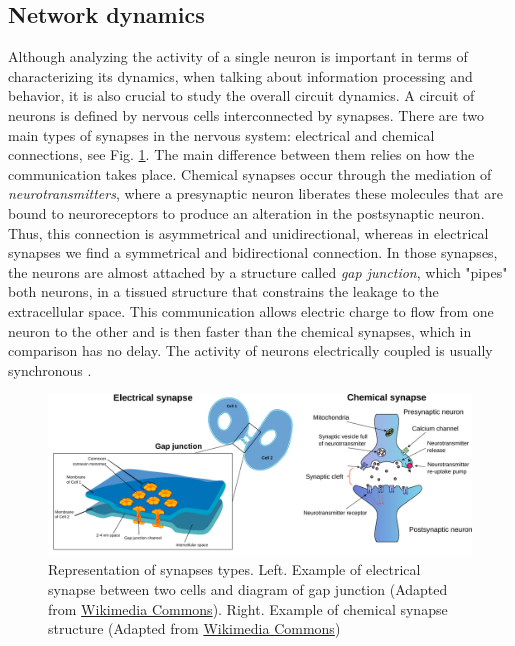 \subsection{Network dynamics}

Although analyzing the activity of a single neuron is important in terms of characterizing its dynamics, when talking about information processing and behavior, it is also crucial to study the overall circuit dynamics. A circuit of neurons is defined by nervous cells interconnected by synapses. There are two main types of synapses in the nervous system: electrical and chemical connections, see Fig. \ref{fig:synapse-types}. The main difference between them relies on how the communication takes place. Chemical synapses occur through the mediation of \textit{neurotransmitters}, where a presynaptic neuron liberates these molecules that are bound to neuroreceptors to produce an alteration in the postsynaptic neuron. Thus, this connection is asymmetrical and unidirectional, whereas in electrical synapses we find a symmetrical and bidirectional connection. In those synapses, the neurons are almost attached by a structure called \textit{gap junction}, which "pipes" both neurons, in a tissued structure that constrains the leakage to the extracellular space. This communication allows electric charge to flow from one neuron to the other and is then faster than the chemical synapses, which in comparison has no delay. The activity of neurons electrically coupled is usually synchronous \parencite{levitan_neuron_2002}.

\begin{figure}[hbt!]
    \centering
    \includegraphics[width=\linewidth]{img/intro/synapses.pdf}
    \caption{Representation of synapses types. Left. Example of electrical synapse between two cells and diagram of gap junction (Adapted from \href{https://commons.wikimedia.org/wiki/File:Gap_cell_junction-en.svg}{Wikimedia Commons}). Right. Example of chemical synapse structure (Adapted from \href{https://commons.wikimedia.org/wiki/File:Synapse_diag1.svg}{Wikimedia Commons})}
    \label{fig:synapse-types}
\end{figure}

